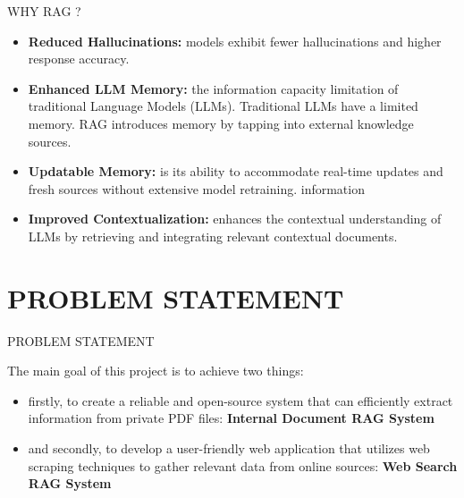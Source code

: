 \documentclass{beamer}
\begin{document}
\begin{frame}{WHY RAG ?}
\begin{itemize}
    \item  \textbf{Reduced Hallucinations:} models exhibit fewer hallucinations and 
higher response accuracy.
\item  \textbf{Enhanced LLM Memory:}  the information capacity limitation of traditional 
Language Models (LLMs). Traditional LLMs have a limited memory. 
RAG introduces memory by tapping into external knowledge sources.

\item \textbf{Updatable Memory:} is its ability to accommodate real-time updates 
and fresh sources without extensive model retraining. 
information
\item \textbf{Improved Contextualization:}  enhances the contextual understanding of LLMs by retrieving 
and integrating relevant contextual documents.
\end{itemize}


    
\end{frame}

\section{PROBLEM STATEMENT}

\begin{frame}{PROBLEM STATEMENT}

The main goal of this project is to achieve two things:   \\

 \begin{itemize}
     \item  firstly, to create a reliable and open-source system 
that can efficiently extract information from private PDF files: \textbf{Internal Document RAG System}
\item and secondly, to develop a user-friendly 
web application that utilizes web scraping techniques to gather relevant data from online sources: \textbf{Web Search RAG System}

 \end{itemize}
 
\end{frame}
\end{document}
